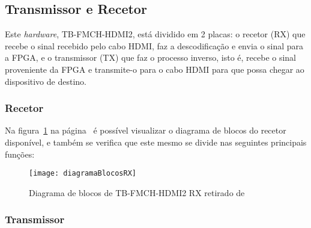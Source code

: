 \subsection{Transmissor e Recetor} \label{batik}
Este \textit{hardware}, TB-FMCH-HDMI2, está dividido em 2 placas: o recetor (RX) que recebe o sinal recebido pelo cabo HDMI, faz a descodificação e envia o sinal para a FPGA, e o transmissor (TX) que faz o processo inverso, isto é, recebe o sinal proveniente da FPGA e transmite-o para o cabo HDMI para que possa chegar ao dispositivo de destino. 
\subsubsection{Recetor}\label{batik}
Na figura~\ref{fig:HDMIblocosRX} na página~\pageref{fig:HDMIblocosRX} é possível visualizar o diagrama de blocos do recetor disponível, e também se verifica que este mesmo se divide nas seguintes principais funções:
\begin{figure}[h!]
	\begin{center}
		\leavevmode
		\texttt{[image: diagramaBlocosRX]}
		\caption{Diagrama de blocos de TB-FMCH-HDMI2 RX retirado de \cite{R009}}
		\label{fig:HDMIblocosRX}
	\end{center}
\end{figure}
\subsubsection{Transmissor}\label{batik} 
